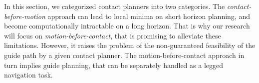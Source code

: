 In this section, we categorized contact planners into two categories.
The \textit{contact-before-motion} approach can lead to local minima on short horizon planning, and become computationally intractable on a long horizon.
That is why our research will focus on \textit{motion-before-contact}, that is promising to alleviate these limitations.
However, it raises the problem of the non-guaranteed feasibility of the guide path by a given contact planner.
The motion-before-contact approach in turn implies guide planning, that can be separately handled as a legged navigation task.





